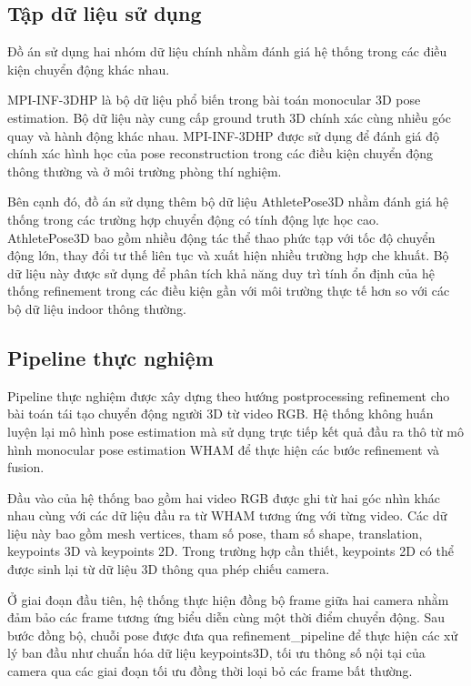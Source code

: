 \documentclass[../DoAn.tex]{subfiles}
\begin{document}
\subsection{Tập dữ liệu sử dụng}

Đồ án sử dụng hai nhóm dữ liệu chính nhằm đánh giá hệ thống trong các điều kiện chuyển động khác nhau.

MPI-INF-3DHP là bộ dữ liệu phổ biến trong bài toán monocular 3D pose estimation. Bộ dữ liệu này cung cấp ground truth 3D chính xác cùng nhiều góc quay và hành động khác nhau. MPI-INF-3DHP được sử dụng để đánh giá độ chính xác hình học của pose reconstruction trong các điều kiện chuyển động thông thường và ở môi trường phòng thí nghiệm.

Bên cạnh đó, đồ án sử dụng thêm bộ dữ liệu AthletePose3D nhằm đánh giá hệ thống trong các trường hợp chuyển động có tính động lực học cao. AthletePose3D bao gồm nhiều động tác thể thao phức tạp với tốc độ chuyển động lớn, thay đổi tư thế liên tục và xuất hiện nhiều trường hợp che khuất. Bộ dữ liệu này được sử dụng để phân tích khả năng duy trì tính ổn định của hệ thống refinement trong các điều kiện gần với môi trường thực tế hơn so với các bộ dữ liệu indoor thông thường.

\subsection{Pipeline thực nghiệm}

Pipeline thực nghiệm được xây dựng theo hướng postprocessing refinement cho bài toán tái tạo chuyển động người 3D từ video RGB. Hệ thống không huấn luyện lại mô hình pose estimation mà sử dụng trực tiếp kết quả đầu ra thô từ mô hình monocular pose estimation WHAM để thực hiện các bước refinement và fusion.

Đầu vào của hệ thống bao gồm hai video RGB được ghi từ hai góc nhìn khác nhau cùng với các dữ liệu đầu ra từ WHAM tương ứng với từng video. Các dữ liệu này bao gồm mesh vertices, tham số pose, tham số shape, translation, keypoints 3D và keypoints 2D. Trong trường hợp cần thiết, keypoints 2D có thể được sinh lại từ dữ liệu 3D thông qua phép chiếu camera.

Ở giai đoạn đầu tiên, hệ thống thực hiện đồng bộ frame giữa hai camera nhằm đảm bảo các frame tương ứng biểu diễn cùng một thời điểm chuyển động. Sau bước đồng bộ, chuỗi pose được đưa qua refinement\_pipeline để thực hiện các xử lý ban đầu như chuẩn hóa dữ liệu keypoints3D, tối ưu thông số nội tại của camera qua các giai đoạn tối ưu đồng thời loại bỏ các frame bất thường.
\end{document}
